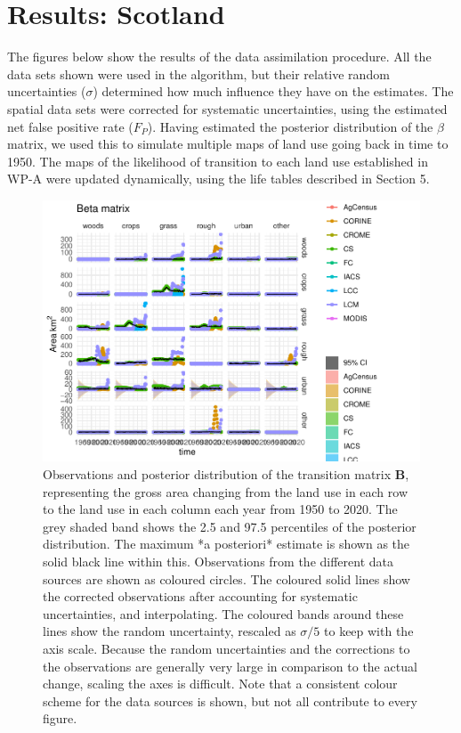 \documentclass[
]{book}
\begin{document}
\hypertarget{results-scotland}{%
\chapter{Results: Scotland}\label{results-scotland}}

The figures below show the results of the data assimilation procedure. All the data sets shown were used in the algorithm, but their relative random uncertainties (\(\sigma\)) determined how much influence they have on the estimates. The spatial data sets were corrected for systematic uncertainties, using the estimated net false positive rate (\(F_P\)). Having estimated the posterior distribution of the \(\beta\) matrix, we used this to simulate multiple maps of land use going back in time to 1950. The maps of the likelihood of transition to each land use established in WP-A were updated dynamically, using the life tables described in Section 5.

\begin{figure}
\includegraphics[width=1.3\linewidth]{Results_sc_files/figure-latex/plotB-1} \caption{ Observations and posterior distribution of the transition matrix $\mathbf{B}$, representing the gross area changing from the land use in each row to the land use in each column each year from 1950 to 2020. The grey shaded band shows the 2.5 and 97.5 percentiles of the posterior distribution. The maximum *a posteriori* estimate is shown as the solid black line within this. Observations from the different data sources are shown as coloured circles. The coloured solid lines show the corrected observations after accounting for systematic uncertainties, and interpolating. The coloured bands around these lines show the random uncertainty, rescaled as $\sigma /5$ to keep with the axis scale. Because the random uncertainties and the corrections to the observations are generally very large in comparison to the actual change, scaling the axes is difficult. Note that a consistent colour scheme for the data sources is shown, but not all contribute to every figure.}\label{fig:plotB}
\end{figure}
\end{document}

